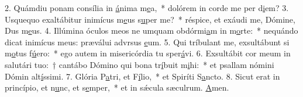 2. Quámdiu ponam consília in \uline{á}nima m\uline{e}a,~* dolórem in corde me per d\uline{i}em?
3. Usquequo exaltábitur inimícus m\uline{e}us s\uline{u}per me?~* réspice, et exáudi me, Dómine, Dus m\uline{e}us.
4. Illúmina óculos meos ne umquam obdórmi\uline{a}m in m\uline{o}rte:~* nequándo dicat inimícus meus: præválui advrsus \uline{e}um.
5. Qui tríbulant me, exsultábunt si m\uline{o}tus f\uline{ú}ero:~* ego autem in misericórdia tu sper\uline{á}vi.
6. Exsultábit cor meum in salutári tuo:~† cantábo Dómino qui bona tr\uline{í}buit m\uline{i}hi:~* et psallam nómini Dómin alt\uline{í}ssimi.
7. Glória P\uline{a}tri, et F\uline{í}lio,~* et Spiríti S\uline{a}ncto.
8. Sicut erat in princípio, et n\uline{u}nc, et s\uline{e}mper,~* et in sǽcula sæculrum. \uline{A}men.

